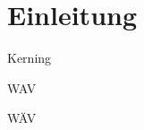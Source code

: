\tikzdeg  %








\initialize                      %


\solutionsInternal

\titleframe

%


\section{Einleitung}


\begin{frame}{Kerning}


WAV

W\"AV

\end{frame}









 \appendixSeparationPage%
  \listOfAppendicesFrame
  \listOfReferencesFrame
  \listOfSourcesFrame
  \listOfFiguresFrame
  \listOfTablesFrame
  \listOfRightsFrame
  \ownRightsRemark
  \citingThisDocument
  \tableOfSymbols
  \indexFrame
  \tableOfFrames
  
  

